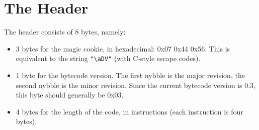 \section{The Header}

The header consists of 8 bytes, namely:

\begin{itemize}
\item 3 bytes for the magic cookie, in hexadecimal: 0x07 0x44 0x56. This is
      equivalent to the string \texttt{"\textbackslash{}aDV"} (with C-style
      escape codes).
\item 1 byte for the bytecode version. The first nybble is the major revision,
      the second nybble is the minor revision. Since the current bytecode
      version is 0.3, this byte should generally be 0x03.
\item 4 bytes for the length of the code, in instructions (each instruction is
      four bytes).
\end{itemize}
